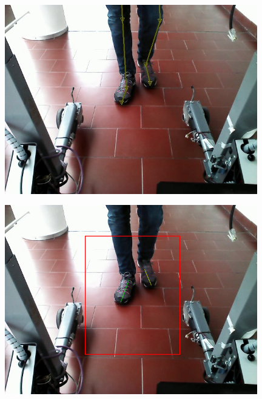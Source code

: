 \documentclass[a4paper]{report}
\begin{document}

\begin{figure}[H]
\centering
\begin{minipage}{.5\textwidth}
  \centering
    \includegraphics[width=0.98\textwidth]{images/building/results/frameGT59.png}
\end{minipage}%
\begin{minipage}{.5\textwidth}
  \centering
    \includegraphics[width=0.98\textwidth]{images/building/results/frame59.png}
    \label{img:Frame59}
\end{minipage}%
\end{figure}
\end{document}
